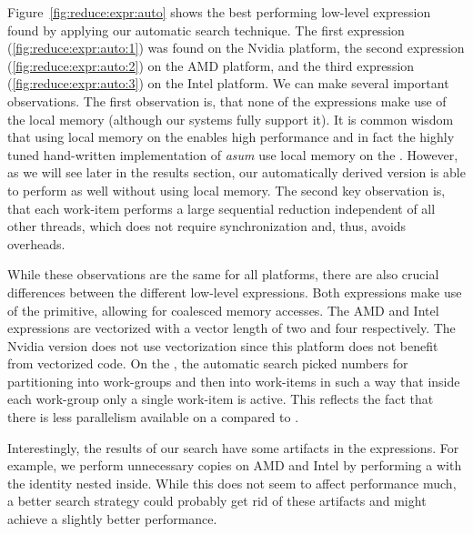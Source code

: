Figure~\ref{fig:reduce:expr:auto} shows the best performing low-level expression found by applying our automatic search technique.
The first expression (\autoref{fig:reduce:expr:auto:1}) was found on the Nvidia platform, the second expression (\autoref{fig:reduce:expr:auto:2}) on the AMD platform, and the third expression (\autoref{fig:reduce:expr:auto:3}) on the Intel platform.
We can make several important observations.
The first observation is, that none of the expressions make use of the local memory (although our systems fully support it).
It is common wisdom that using local memory on the \GPU enables high performance and in fact the highly tuned hand-written implementation of \textit{asum} use local memory on the \GPU.
However, as we will see later in the results section, our automatically derived version is able to perform as well without using local memory.
The second key observation is, that each work-item performs a large sequential reduction independent of all other threads, which does not require synchronization and, thus, avoids overheads.

While these observations are the same for all platforms, there are also crucial differences between the different low-level expressions.
Both \GPU expressions make use of the \reorderStride primitive, allowing for coalesced memory accesses.
The AMD and Intel expressions are vectorized with a vector length of two and four respectively.
The Nvidia version does not use vectorization since this platform does not benefit from vectorized code.
On the \CPU, the automatic search picked numbers for partitioning into work-groups and then into work-items in such a way that inside each work-group only a single work-item is active.
This reflects the fact that there is less parallelism available on a \CPU compared to \GPUs.

Interestingly, the results of our search have some artifacts in the expressions.
For example, we perform unnecessary copies on AMD and Intel by performing a \mapSeq with the identity nested inside.
While this does not seem to affect performance much, a better search strategy could probably get rid of these artifacts and might achieve a slightly better performance.


